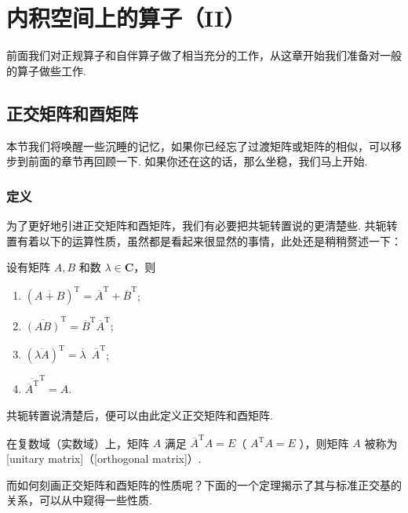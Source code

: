 \chapter{内积空间上的算子（II）}

前面我们对正规算子和自伴算子做了相当充分的工作，从这章开始我们准备对一般的算子做些工作.

\section{正交矩阵和酉矩阵}

本节我们将唤醒一些沉睡的记忆，如果你已经忘了过渡矩阵或矩阵的相似，可以移步到前面的章节再回顾一下. 如果你还在这的话，那么坐稳，我们马上开始.

\subsection{定义}

为了更好地引进正交矩阵和酉矩阵，我们有必要把共轭转置说的更清楚些. 共轭转置有着以下的运算性质，虽然都是看起来很显然的事情，此处还是稍稍赘述一下：

设有矩阵 $ A, B $ 和数 $ \lambda \in \mathbf{C}$，则

\begin{enumerate}
    \item $ (\overline{A + B})^{\mathrm{T}} = \overline{A}^{\mathrm{T}} + \overline{B}^{\mathrm{T}} $;

    \item $ \overline{(AB)}^{\mathrm{T}} = \overline{B}^{\mathrm{T}} \overline{A}^{\mathrm{T}} $;

    \item $ (\overline{\lambda A})^{\mathrm{T}} = \overline{\lambda} \enspace \overline{A}^{\mathrm{T}} $;

    \item $ \overline{\overline{A}^{\mathrm{T}}}^{\mathrm{T}} = A $.
\end{enumerate}

共轭转置说清楚后，便可以由此定义正交矩阵和酉矩阵.

\begin{definition}
    在复数域（实数域）上，矩阵 $ A $ 满足 $ \overline{A}^{\mathrm{T}} A = E $（ $ {A}^{\mathrm{T}} A = E $ ），则矩阵 $ A $ 被称为[unitary matrix]（[orthogonal matrix]）.
\end{definition}

而如何刻画正交矩阵和酉矩阵的性质呢？下面的一个定理揭示了其与标准正交基的关系，可以从中窥得一些性质.

